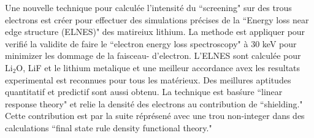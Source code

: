 Une nouvelle technique pour calcul\'ee l'intensit\'e du ``screening" sur des trous electrons est cr\'eer pour effectuer des simulations pr\'ecises de la ``Energy loss near edge structure (ELNES)" des matireiux lithium. La methode est appliquer pour verifi\'e la validite de faire le ``electron energy loss spectroscopy" \`a 30 keV pour minimizer les dommage de la faisceau- d'electron. L'ELNES sont calcul\'ee pour $ \mathrm{Li_2O} $, LiF et le lithium metalique et une meilleur accordance avex les resultats experimental est reconnues pour tous les mat\'erieux.  Des meillures aptitudes quantitatif et predictif sont aussi obtenu.   La technique est bas\' sure ``linear response theory" et relie la densit\'e des electrons au contribution de ``shielding."  Cette contribution est par la suite r\'epr\'esen\'e avec une trou non-integer dans des calculations ``final state rule density functional theory." 






